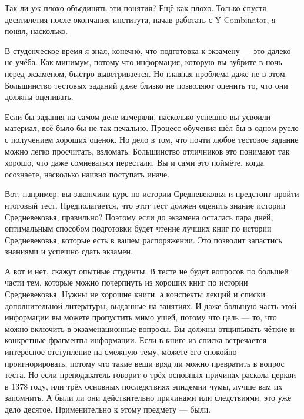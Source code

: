 \documentclass[ebook,12pt,oneside,openany]{memoir}
\begin{document}
Так ли уж плохо объединять эти понятия? Ещё как плохо. Только спустя
десятилетия после окончания института, начав работать с Y Combinator,
я понял, насколько. \newline

В студенческое время я знал, конечно, что подготовка к экзамену — это
далеко не учёба. Как минимум, потому что информация, которую вы
зубрите в ночь перед экзаменом, быстро выветривается. Но главная
проблема даже не в этом. Большинство тестовых заданий даже близко не
позволяют оценить то, что они должны оценивать. \newline

Если бы задания на самом деле измеряли, насколько успешно вы усвоили
материал, всё было бы не так печально. Процесс обучения шёл бы в одном
русле с получением хороших оценок. Но дело в том, что почти любое
тестовое задание можно легко просчитать, взломать. Большинство
отличников это понимают так хорошо, что даже сомневаться перестали. Вы
и сами это поймёте, когда осознаете, насколько наивно поступать иначе. \newline

Вот, например, вы закончили курс по истории Средневековья и предстоит
пройти итоговый тест. Предполагается, что этот тест должен оценить
знание истории Средневековья, правильно? Поэтому если до экзамена
осталась пара дней, оптимальным способом подготовки будет чтение
лучших книг по истории Средневековья, которые есть в вашем
распоряжении. Это позволит запастись знаниями и успешно сдать экзамен. \newline

А вот и нет, скажут опытные студенты. В тесте не будет вопросов по
большей части тем, которые можно почерпнуть из хороших книг по истории
Средневековья. Нужны не хорошие книги, а конспекты лекций и списки
дополнительной литературы, выданные на занятиях. И даже большую часть
этой информации вы можете пропустить мимо ушей, потому что цель — то,
что можно включить в экзаменационные вопросы. Вы должны отщипывать
чёткие и конкретные фрагменты информации. Если в книге из списка
встречается интересное отступление на смежную тему, можете его
спокойно проигнорировать, потому что такие вещи вряд ли можно
превратить в вопрос теста. Но если преподаватель говорит о трёх
основных причинах раскола церкви в 1378 году, или трёх основных
последствиях эпидемии чумы, лучше вам их запомнить. А были ли они
действительно причинами или следствиями, это уже дело десятое.
Применительно к этому предмету — были. \newline
\end{document}
